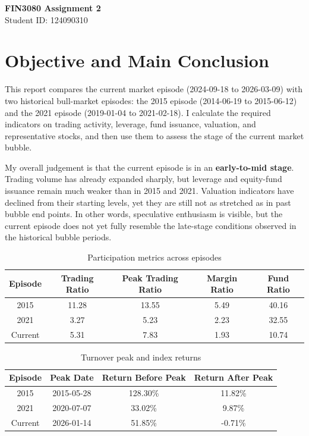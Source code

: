 \documentclass[11pt]{article}
\begin{document}
\begin{center}
\textbf{FIN3080 Assignment 2}\\
Student ID: 124090310
\end{center}

\section{Objective and Main Conclusion}

This report compares the current market episode (2024-09-18 to 2026-03-09) with two historical bull-market episodes: the 2015 episode (2014-06-19 to 2015-06-12) and the 2021 episode (2019-01-04 to 2021-02-18). I calculate the required indicators on trading activity, leverage, fund issuance, valuation, and representative stocks, and then use them to assess the stage of the current market bubble.

My overall judgement is that the current episode is in an \textbf{early-to-mid stage}. Trading volume has already expanded sharply, but leverage and equity-fund issuance remain much weaker than in 2015 and 2021. Valuation indicators have declined from their starting levels, yet they are still not as stretched as in past bubble end points. In other words, speculative enthusiasm is visible, but the current episode does not yet fully resemble the late-stage conditions observed in the historical bubble periods.

\begin{table}[H]
\centering
\caption{Participation metrics across episodes}
\begin{tabular}{ccccc}
\toprule
Episode & Trading Ratio & Peak Trading Ratio & Margin Ratio & Fund Ratio \\
\midrule
2015 & 11.28 & 13.55 & 5.49 & 40.16 \\
2021 & 3.27 & 5.23 & 2.23 & 32.55 \\
Current & 5.31 & 7.83 & 1.93 & 10.74 \\
\bottomrule
\end{tabular}
\end{table}

\begin{table}[H]
\centering
\caption{Turnover peak and index returns}
\begin{tabular}{cccc}
\toprule
Episode & Peak Date & Return Before Peak & Return After Peak \\
\midrule
2015 & 2015-05-28 & 128.30\% & 11.82\% \\
2021 & 2020-07-07 & 33.02\% & 9.87\% \\
Current & 2026-01-14 & 51.85\% & -0.71\% \\
\bottomrule
\end{tabular}
\end{table}
\end{document}
